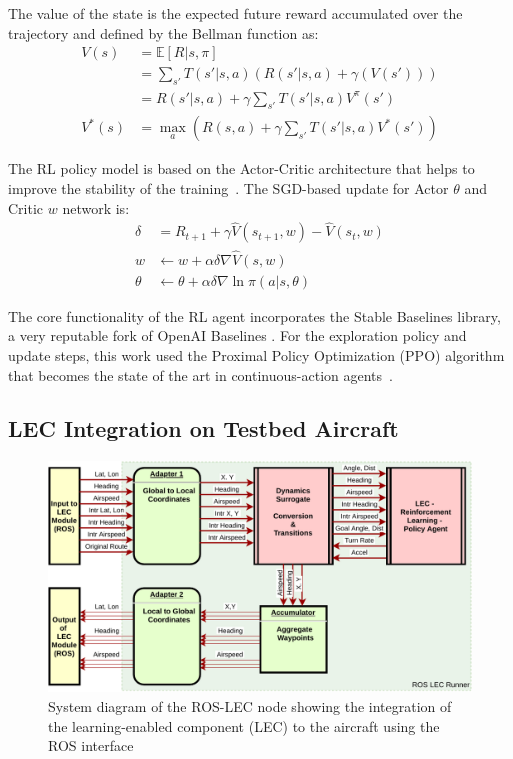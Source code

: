 The value of the state is the expected future reward accumulated over the trajectory and defined by the Bellman function as:
\begin{align}
	V(s) &=  \mathbb{E} [R | s, \pi] \\
	&= \sum_{s'} T(s'|s,a) \left( R(s'|s,a) + \gamma ( V(s')) \right) \\
	&=  R(s'|s,a) + \gamma \sum_{s'} T(s'|s,a) V^{\pi}(s') \\
	V^{*}(s) &= \max_{a} \left( R(s,a) + \gamma \sum_{s'} T(s'|s,a) V^{*}(s') \right)
\end{align}

The RL policy model is based on the Actor-Critic architecture that helps to improve the stability of the training~\cite{sutton2018reinforcement}. The SGD-based update for Actor $\theta$ and Critic $w$ network is:
\begin{align}
	\delta &=  R_{t+1} +\gamma \hat V(s_{t+1},w) - \hat V(s_t,w) \\
	w &\leftarrow w + \alpha \delta \nabla \hat V (s, w) \\
	\theta &\leftarrow \theta + \alpha \delta \nabla \ln \pi (a|s, \theta)
\end{align} 

The core functionality of the RL agent incorporates the Stable Baselines library, a very reputable fork of OpenAI Baselines \cite{hill2018stable}. For the exploration policy and update steps, this work used the Proximal Policy Optimization (PPO) algorithm that becomes the state of the art in continuous-action agents~\cite{schulman2017proximal}.


\subsection{LEC Integration on Testbed Aircraft}

\begin{figure}[h]
	\centering
	\includegraphics[width=\linewidth]{figures/cp25_ros.pdf}
	\caption{System diagram of the ROS-LEC node showing the integration of the learning-enabled component (LEC) to the aircraft using the ROS interface}
	\label{fig:integration}
\end{figure}

